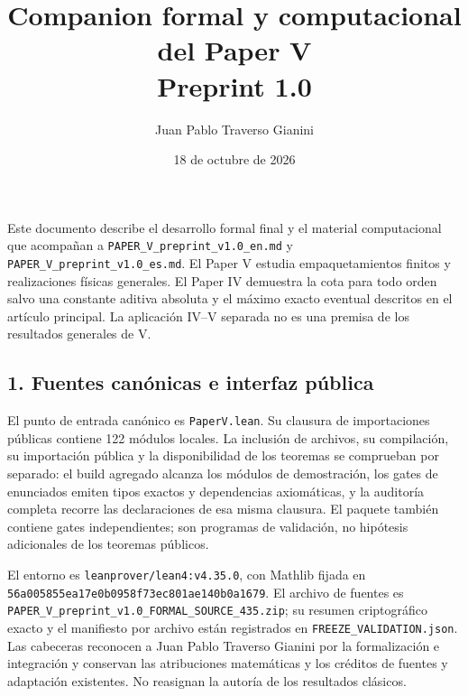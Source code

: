 \documentclass[spanish,11pt,a4paper]{article}
\title{Companion formal y computacional del Paper V\\Preprint 1.0}
\author{Juan Pablo Traverso Gianini}
\date{18 de octubre de 2026}
\begin{document}
\raggedbottom
\maketitle
\setlength{\parskip}{5pt}
Este documento describe el desarrollo formal final y el material
computacional que acompañan a \nolinkurl{PAPER_V_preprint_v1.0_en.md} y
\nolinkurl{PAPER_V_preprint_v1.0_es.md}. El Paper V estudia
empaquetamientos finitos y realizaciones físicas generales. El Paper IV
demuestra la cota para todo orden salvo una constante aditiva absoluta y
el máximo exacto eventual descritos en el artículo principal. La
aplicación IV--V separada no es una premisa de los resultados generales
de V.

\subsection{1. Fuentes canónicas e interfaz
pública}\label{fuentes-canuxf3nicas-e-interfaz-puxfablica}

El punto de entrada canónico es \texttt{PaperV.lean}. Su clausura de
importaciones públicas contiene 122 módulos locales. La inclusión de
archivos, su compilación, su importación pública y la disponibilidad de
los teoremas se comprueban por separado: el build agregado alcanza los
módulos de demostración, los gates de enunciados emiten tipos exactos y
dependencias axiomáticas, y la auditoría completa recorre las
declaraciones de esa misma clausura. El paquete también contiene gates
independientes; son programas de validación, no hipótesis adicionales de
los teoremas públicos.

El entorno es \texttt{leanprover/lean4:v4.35.0}, con Mathlib fijada en
\nolinkurl{56a005855ea17e0b0958f73ec801ae140b0a1679}. El archivo de fuentes
es \nolinkurl{PAPER_V_preprint_v1.0_FORMAL_SOURCE_435.zip}; su
resumen criptográfico exacto y el manifiesto por archivo están
registrados en \nolinkurl{FREEZE_VALIDATION.json}. Las cabeceras reconocen
a Juan Pablo Traverso Gianini por la formalización e integración y
conservan las atribuciones matemáticas y los créditos de fuentes y
adaptación existentes. No reasignan la autoría de los resultados
clásicos.
\end{document}
